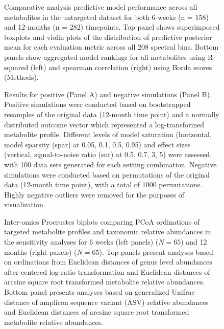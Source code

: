 \begin{figure}[!h]
    \centering
    \caption[Comparative analysis predictive model performance across all metabolites in the untargeted dataset for both 6-weeks (n = 158) and 12-months (n = 282) timepoints.]{Comparative analysis predictive model performance across all metabolites in the untargeted dataset for both 6-weeks (n = 158) and 12-months (n = 282) timepoints. Top panel shows superimposed boxplots and violin plots of the distribution of predictive posterior mean for each evaluation metric across all 208 spectral bins. Bottom panels show aggregated model rankings for all metabolites using R-squared (left) and spearman correlation (right) using Borda scores (Methods).}
    \label{fig:b3}
\end{figure}

\begin{figure}[!h]
    \centering
    \caption[Results for positive (Panel A) and negative simulations (Panel B)]{Results for positive (Panel A) and negative simulations (Panel B). Positive simulations were conducted based on bootstrapped resamples of the original data (12-month time point) and a normally distributed outcome vector which represented a log-transformed metabolite profile. Different levels of model saturation (horizontal, model sparsity (spar) at 0.05, 0.1, 0.5, 0.95) and effect sizes (vertical, signal-to-noise ratio (snr) at 0.5, 0.7, 3, 5) were assessed, with 100 data sets generated for each setting combination. Negative simulations were conducted based on permutations of the original data (12-month time point), with a total of 1000 permutations. Highly negative outliers were removed for the purposes of visualization.}
    \label{fig:b4}
\end{figure}

\begin{figure}[!h]
    \centering
    \caption[Inter-omics Procrustes biplots comparing PCoA ordinations of targeted metabolite profiles and taxonomic relative abundances in the sensitivity analyses for 6 weeks (left panels) ($N = 65$) and 12 months (right panels) ($N = 65$)]{Inter-omics Procrustes biplots comparing PCoA ordinations of targeted metabolite profiles and taxonomic relative abundances in the sensitivity analyses for 6 weeks (left panels) ($N = 65$) and 12 months (right panels) ($N = 65$). Top panels present analyses based on ordinations from Euclidean distances of genus level abundances after centered log ratio transformation and Euclidean distances of arcsine square root transformed metabolite relative abundances. Bottom panel presents analyses based on generalized Unifrac distance of amplicon sequence variant (ASV) relative abundances and Euclidean distances of arcsine square root transformed metabolite relative abundances.}
    \label{fig:b5}
\end{figure}

